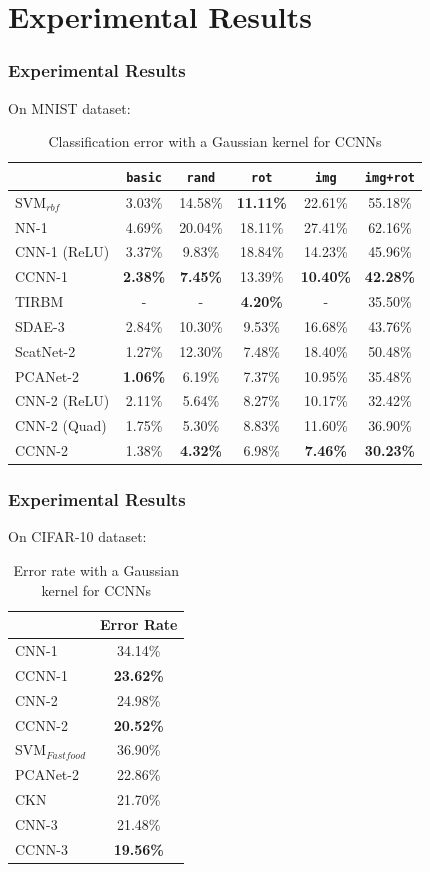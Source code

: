 \documentclass[hyperref={colorlinks}]{beamer}
\begin{document}
\section{Experimental Results}
\begin{frame}
	\frametitle{Experimental Results}
	On MNIST dataset:
	\begin{table}
		\begin{tabular}{|l|c|c|c|c|c|}
			\hline
			 & \texttt{basic} & \texttt{rand} & \texttt{rot} & \texttt{img} & \texttt{img+rot} \\
			\hline
			SVM$_{rbf}$ & 3.03\% & 14.58\% & \textbf{11.11\%} & 22.61\% & 55.18\% \\
			NN-1 & 4.69\% & 20.04\% & 18.11\% & 27.41\% & 62.16\% \\
			CNN-1 (ReLU) & 3.37\% & 9.83\% & 18.84\% & 14.23\% & 45.96\% \\
			CCNN-1 & \textbf{2.38\%} & \textbf{7.45\%} & 13.39\% & \textbf{10.40\%} & \textbf{42.28\%} \\
			\hline
			TIRBM & - & - & \textbf{4.20\%} & - & 35.50\% \\
			SDAE-3 & 2.84\% & 10.30\% & 9.53\% & 16.68\% & 43.76\% \\
			ScatNet-2 & 1.27\% & 12.30\% & 7.48\% & 18.40\% & 50.48\% \\
			PCANet-2 & \textbf{1.06\%} & 6.19\% & 7.37\% & 10.95\% & 35.48\% \\
			CNN-2 (ReLU) & 2.11\% & 5.64\% & 8.27\% & 10.17\% & 32.42\% \\
			CNN-2 (Quad) & 1.75\% & 5.30\% & 8.83\% & 11.60\% & 36.90\% \\
			CCNN-2 & 1.38\% & \textbf{4.32\%} & 6.98\% & \textbf{7.46\%} & \textbf{30.23\%} \\
			\hline
		\end{tabular}
		\caption{Classification error with a Gaussian kernel for CCNNs}
		\label{tab:mnist-results}
	\end{table}
\end{frame}

\begin{frame}
	\frametitle{Experimental Results}
	On CIFAR-10 dataset:
	\begin{table}
		\begin{tabular}{|l|c|}
			\hline
			 & Error Rate \\
			\hline
			CNN-1 & 34.14\% \\
			CCNN-1 & \textbf{23.62\%} \\
			\hline
			CNN-2 & 24.98\% \\
			CCNN-2 & \textbf{20.52\%} \\
			\hline
			SVM$_{Fastfood}$ & 36.90\% \\
			PCANet-2 & 22.86\% \\
			CKN & 21.70\% \\
			CNN-3 & 21.48\% \\
			CCNN-3 & \textbf{19.56\%} \\
			\hline
		\end{tabular}
		\caption{Error rate with a Gaussian kernel for CCNNs}
		\label{tab:cifar-10-results}
	\end{table}
\end{frame}
\end{document}
